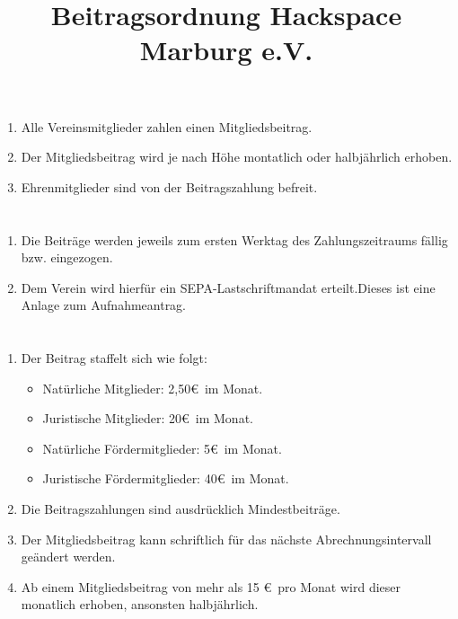 \documentclass[10pt,conference,a4paper,onecolumn,nofonttune]{IEEEtran}
\begin{document}
 
  
\title{Beitragsordnung Hackspace Marburg e.V.}

\maketitle


\section{}
\begin{enumerate}
  \item Alle Vereinsmitglieder zahlen einen Mitgliedsbeitrag.

  \item Der Mitgliedsbeitrag wird je nach Höhe montatlich oder halbjährlich
    erhoben.

  \item Ehrenmitglieder sind von der Beitragszahlung befreit.
\end{enumerate}


\section{}
\begin{enumerate}
  \item Die Beiträge werden jeweils zum ersten Werktag des Zahlungszeitraums
    fällig bzw. eingezogen.

  \item Dem Verein wird hierfür ein SEPA-Lastschriftmandat erteilt.Dieses ist
    eine Anlage zum Aufnahmeantrag.
\end{enumerate}
  

\section{} 
\begin{enumerate}
  \item Der Beitrag staffelt sich wie folgt:
    \begin{itemize}
      \item Natürliche Mitglieder: 2,50\euro\ im Monat.
      \item Juristische Mitglieder: 20\euro\ im Monat.
      \item Natürliche Fördermitglieder: 5\euro\ im Monat.
      \item Juristische Fördermitglieder: 40\euro\ im Monat.
    \end{itemize}

  \item Die Beitragszahlungen sind ausdrücklich Mindestbeiträge.

  \item Der Mitgliedsbeitrag kann schriftlich für das nächste
    Abrechnungsintervall geändert werden.

  \item Ab einem Mitgliedsbeitrag von mehr als 15 \euro\ pro Monat wird dieser
    monatlich erhoben, ansonsten halbjährlich.
\end{enumerate}
\end{document}
